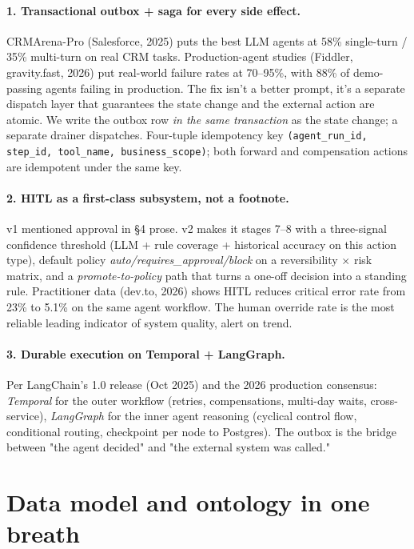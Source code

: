 \documentclass[11pt,a4paper]{article}
\begin{document}
\paragraph{1. Transactional outbox + saga for every side effect.}
CRMArena-Pro (Salesforce, 2025) puts the best LLM agents at 58\%
single-turn / 35\% multi-turn on real CRM tasks. Production-agent
studies (Fiddler, gravity.fast, 2026) put real-world failure rates at
70--95\%, with 88\% of demo-passing agents failing in production. The
fix isn't a better prompt, it's a separate dispatch layer that
guarantees the state change and the external action are atomic. We
write the outbox row \emph{in the same transaction} as the state
change; a separate drainer dispatches. Four-tuple idempotency key
\texttt{(agent\_run\_id, step\_id, tool\_name, business\_scope)}; both
forward and compensation actions are idempotent under the same key.

\paragraph{2. HITL as a first-class subsystem, not a footnote.}
v1 mentioned approval in §4 prose. v2 makes it stages 7--8 with a
three-signal confidence threshold (LLM + rule coverage + historical
accuracy on this action type), default policy
\emph{auto/requires\_approval/block} on a reversibility $\times$ risk
matrix, and a \emph{promote-to-policy} path that turns a one-off
decision into a standing rule. Practitioner data (dev.to, 2026) shows
HITL reduces critical error rate from 23\% to 5.1\% on the same agent
workflow. The human override rate is the most reliable leading
indicator of system quality, alert on trend.

\paragraph{3. Durable execution on Temporal + LangGraph.}
Per LangChain's 1.0 release (Oct 2025) and the 2026 production
consensus: \emph{Temporal} for the outer workflow (retries,
compensations, multi-day waits, cross-service), \emph{LangGraph} for
the inner agent reasoning (cyclical control flow, conditional routing,
checkpoint per node to Postgres). The outbox is the bridge between
"the agent decided" and "the external system was called."

\section{Data model and ontology in one breath}
\end{document}
